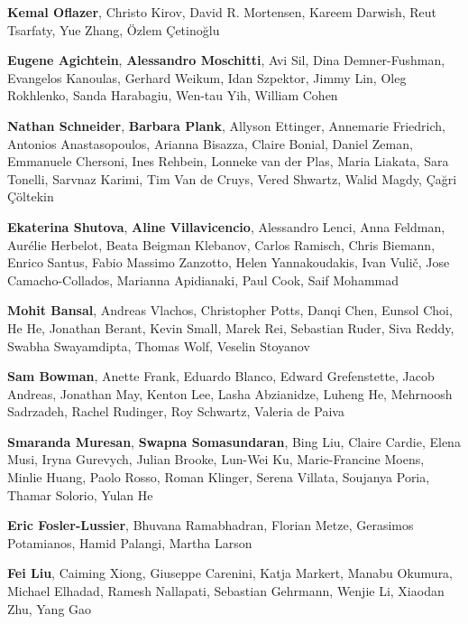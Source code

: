 \documentclass[11pt]{article}
\newcommand{\aclitem}[1][]{\item[#1:\vspace{2mm}]}
\begin{document}
\begin{description}[itemsep=4mm, style=nextline]
\begin{description}[itemsep=4mm, style=nextline]
\aclitem[Phonology, Morphology and Word Segmentation]
\textbf{Kemal Oflazer},
Christo Kirov, David R. Mortensen, Kareem Darwish, Reut Tsarfaty, Yue Zhang, \"{O}zlem \c{C}etino\u{g}lu

\aclitem[Question Answering]
\textbf{Eugene Agichtein},
\textbf{Alessandro Moschitti},
Avi Sil, Dina Demner-Fushman, Evangelos Kanoulas, Gerhard Weikum, Idan Szpektor, Jimmy Lin, Oleg Rokhlenko, Sanda Harabagiu, Wen-tau Yih, William Cohen

\aclitem[Resources and Evaluation]
\textbf{Nathan Schneider},
\textbf{Barbara Plank},
Allyson Ettinger, Annemarie Friedrich, Antonios Anastasopoulos, Arianna Bisazza, Claire Bonial, Daniel Zeman, Emmanuele Chersoni, Ines Rehbein, Lonneke van der Plas, Maria Liakata, Sara Tonelli, Sarvnaz Karimi, Tim Van de Cruys, Vered Shwartz, Walid Magdy, \c{C}a\u{g}ri \c{C}\"{o}ltekin

\aclitem[Semantics: Lexical]
\textbf{Ekaterina Shutova},
\textbf{Aline Villavicencio},
Alessandro Lenci, Anna Feldman, Aur\'{e}lie Herbelot, Beata Beigman Klebanov, Carlos Ramisch, Chris Biemann, Enrico Santus, Fabio Massimo Zanzotto, Helen Yannakoudakis, Ivan Vuli\v{c}, Jose Camacho-Collados, Marianna Apidianaki, Paul Cook, Saif Mohammad

\aclitem[Semantics: Sentence Level]
\textbf{Mohit Bansal},
Andreas Vlachos, Christopher Potts, Danqi Chen, Eunsol Choi, He He, Jonathan Berant, Kevin Small, Marek Rei, Sebastian Ruder, Siva Reddy, Swabha Swayamdipta, Thomas Wolf, Veselin Stoyanov

\aclitem[Semantics: Textual Inference and Other Areas of Semantics]
\textbf{Sam Bowman},
Anette Frank, Eduardo Blanco, Edward Grefenstette, Jacob Andreas, Jonathan May, Kenton Lee, Lasha Abzianidze, Luheng He, Mehrnoosh Sadrzadeh, Rachel Rudinger, Roy Schwartz, Valeria de Paiva

\aclitem[Sentiment Analysis, Stylistic Analysis, and Argument Mining]
\textbf{Smaranda Muresan},
\textbf{Swapna Somasundaran},
Bing Liu, Claire Cardie, Elena Musi, Iryna Gurevych, Julian Brooke, Lun-Wei Ku, Marie-Francine Moens, Minlie Huang, Paolo Rosso, Roman Klinger, Serena Villata, Soujanya Poria, Thamar Solorio, Yulan He

\aclitem[Speech and Multimodality]
\textbf{Eric Fosler-Lussier},
Bhuvana Ramabhadran, Florian Metze, Gerasimos Potamianos, Hamid Palangi, Martha Larson

\aclitem[Summarization]
\textbf{Fei Liu},
Caiming Xiong, Giuseppe Carenini, Katja Markert, Manabu Okumura, Michael Elhadad, Ramesh Nallapati, Sebastian Gehrmann, Wenjie Li, Xiaodan Zhu, Yang Gao


\end{description}
\end{description}
\end{document}
